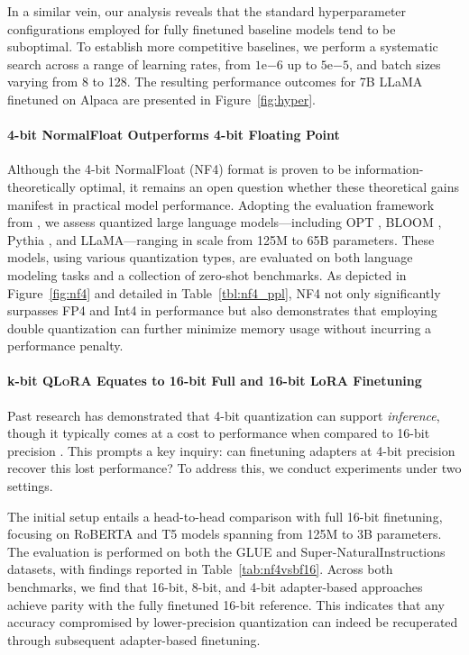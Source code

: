 In a similar vein, our analysis reveals that the standard hyperparameter configurations employed for fully finetuned baseline models tend to be suboptimal. To establish more competitive baselines, we perform a systematic search across a range of learning rates, from $1\mathrm{e}{-6}$ up to $5\mathrm{e}{-5}$, and batch sizes varying from 8 to 128. The resulting performance outcomes for 7B LLaMA finetuned on Alpaca are presented in Figure~\ref{fig:hyper}.

\paragraph{4-bit NormalFloat Outperforms 4-bit Floating Point}

Although the 4-bit NormalFloat (NF4) format is proven to be information-theoretically optimal, it remains an open question whether these theoretical gains manifest in practical model performance. Adopting the evaluation framework from \citet{dettmers2022case}, we assess quantized large language models—including OPT \citep{zhang2022opt}, BLOOM \cite{scao2022bloom}, Pythia \cite{biderman2023pythia}, and LLaMA—ranging in scale from 125M to 65B parameters. These models, using various quantization types, are evaluated on both language modeling tasks and a collection of zero-shot benchmarks. As depicted in Figure~\ref{fig:nf4} and detailed in Table~\ref{tbl:nf4_ppl}, NF4 not only significantly surpasses FP4 and Int4 in performance but also demonstrates that employing double quantization can further minimize memory usage without incurring a performance penalty.

\paragraph{k-bit \textsc{QLoRA} Equates to 16-bit Full and 16-bit LoRA Finetuning}

Past research has demonstrated that 4-bit quantization can support \emph{inference}, though it typically comes at a cost to performance when compared to 16-bit precision \citep{dettmers2022case,frantar2022gptq}. This prompts a key inquiry: can finetuning adapters at 4-bit precision recover this lost performance? To address this, we conduct experiments under two settings.

The initial setup entails a head-to-head comparison with full 16-bit finetuning, focusing on RoBERTA and T5 models spanning from 125M to 3B parameters. The evaluation is performed on both the GLUE and Super-NaturalInstructions datasets, with findings reported in Table~\ref{tab:nf4vsbf16}. Across both benchmarks, we find that 16-bit, 8-bit, and 4-bit adapter-based approaches achieve parity with the fully finetuned 16-bit reference. This indicates that any accuracy compromised by lower-precision quantization can indeed be recuperated through subsequent adapter-based finetuning.

